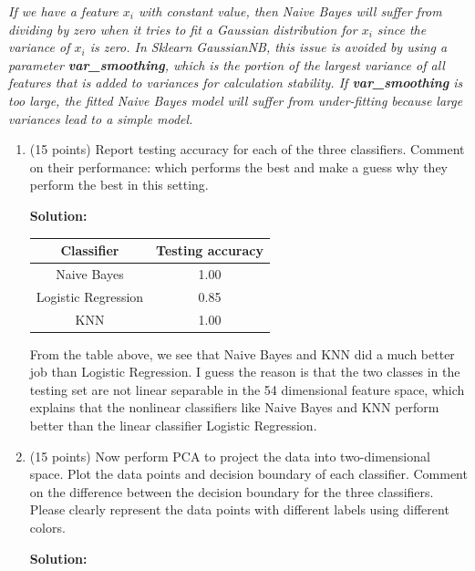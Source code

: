 \documentclass[twoside,10pt]{article}
\begin{document}
\begin{enumerate}
\textit{{\color{red} If we have a feature $x_i$ with constant value, then Naive Bayes will suffer from dividing by zero when it tries to fit a Gaussian distribution for $x_i$ since the variance of $x_i$ is zero. In Sklearn GaussianNB, this issue is avoided by using a parameter \textbf{var\_smoothing}, which is the portion of the largest variance of all features that is added to variances for calculation stability. If \textbf{var\_smoothing} is too large, the fitted Naive Bayes model will suffer from under-fitting because large variances lead to a simple model.  }}

\begin{enumerate}

	\item (15 points) Report testing accuracy for each of the three classifiers.  Comment on their performance: which performs the best and make a guess why they perform the best in this setting. 
	\begin{tcolorbox}
	\textbf{Solution:} \\
	\begin{center}
	\begin{tabular}{| c | c |}%
	\hline
	Classifier & Testing accuracy \\
	\hline
        Naive Bayes & 1.00 \\
        \hline
        Logistic Regression &0.85\\
        \hline
        KNN & 1.00\\
        \hline
        \end{tabular}
        \end{center}
        From the table above, we see that Naive Bayes and KNN did a much better job than Logistic Regression. I guess the reason is that the two classes in the testing set are not linear separable in the 54 dimensional feature space, which explains that the nonlinear classifiers like Naive Bayes and KNN perform better than the linear classifier Logistic Regression.
	\end{tcolorbox}
	\item (15 points) Now perform PCA to project the data into two-dimensional space. Plot the data points and decision boundary of each classifier. Comment on the difference between the decision boundary for the three classifiers. Please clearly represent the data points with different labels using different colors.
\begin{tcolorbox}
\textbf{Solution:}\\


\end{tcolorbox}
\end{enumerate}
\end{enumerate}
\end{document}
